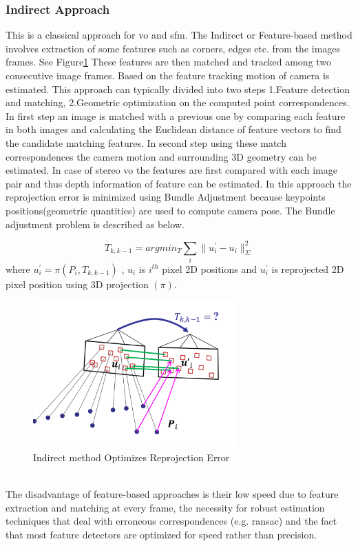 \subsubsection{Indirect Approach}
This is a classical approach for \acrshort{vo} and \acrshort{sfm}. The Indirect or Feature-based method involves extraction of some features such as corners, edges etc. from the images frames. See Figure\ref{fig:feature} These features are then matched and tracked among two consecutive image frames. Based on the feature tracking motion of camera is estimated. This approach can typically divided into two steps 1.Feature detection and matching, 2.Geometric optimization on the computed point correspondences. In first step an image is matched with a previous one by comparing each feature in both images and calculating the Euclidean distance of feature vectors to find the candidate matching features.\cite{Aqel-et-al-2016} In second step using these match correspondences the camera motion and surrounding 3D geometry can be estimated. In case of stereo \acrshort{vo} the features are first compared with each image pair and thus depth information of feature can be estimated. In this approach the reprojection error is minimized using Bundle Adjustment because keypoints positions(geometric quantities) are used to compute camera pose. The Bundle adjustment problem is described as below. 

\begin{equation*}
	T_{k,k-1} = arg min_{T} \sum_{i} \| u^{'}_{i}- u_{i}\|^{2}_{\Sigma}
\end{equation*}
where   $u^{'}_{i} = \pi (P_{i},T_{k,k-1})$ , $ u_{i} $ is $ i^{th} $  pixel 2D positions and $ u^{'}_{i} $ is reprojected 2D pixel position using 3D projection $(\pi)$.  
\newline
\begin{figure}[h]
	\centering
	\includegraphics[width=0.7\textwidth]{indirect}
	\caption{Indirect method Optimizes Reprojection Error}
	\label{fig:feature}
\end{figure}
\\
The disadvantage of feature-based approaches is their low speed due to feature extraction and matching at every frame, the necessity for robust estimation techniques that deal with erroneous correspondences (e.g. \acrshort{ransac}) and the fact that most feature detectors are optimized for speed rather than precision.\cite{7782863}

